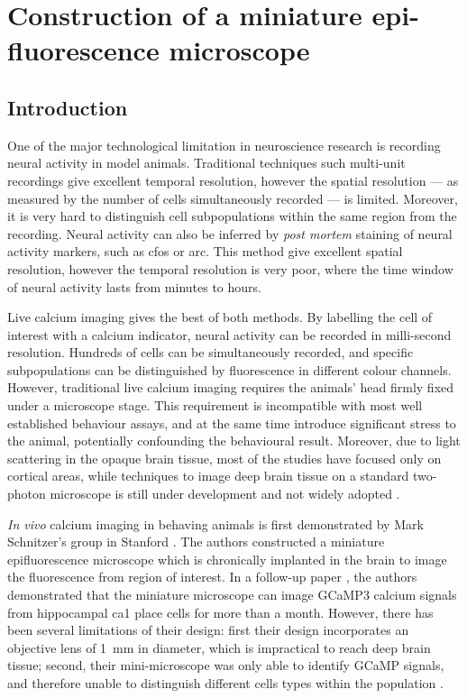 \chapter{Construction of a miniature epi-fluorescence microscope \label{chap-scope}}

\section{Introduction}

One of the major technological limitation in neuroscience research is recording neural activity in model animals. Traditional techniques such multi-unit recordings give excellent temporal resolution, however the spatial resolution --- as measured by the number of cells simultaneously recorded --- is limited. Moreover, it is very hard to distinguish cell subpopulations within the same region from the recording. Neural activity can also be inferred by \textit{post mortem} staining of neural activity markers, such as cfos or arc. This method give excellent spatial resolution, however the temporal resolution is very poor, where the time window of neural activity lasts from minutes to hours.

    Live calcium imaging gives the best of both methods. By labelling the cell of interest with a calcium indicator, neural activity can be recorded in milli-second resolution. Hundreds of cells can be simultaneously recorded, and specific subpopulations can be distinguished by fluorescence in different colour channels. However, traditional live calcium imaging requires the animals' head firmly fixed under a microscope stage. This requirement is incompatible with most well established behaviour assays, and at the same time introduce significant stress to the animal, potentially confounding the behavioural result. Moreover, due to light scattering in the opaque brain tissue, most of the studies have focused only on cortical areas, while techniques to image deep brain tissue on a standard two-photon microscope is still under development and not widely adopted \citep{barretto12}.

    \textit{In vivo} calcium imaging in behaving animals is first demonstrated by Mark Schnitzer's group in Stanford \citep{ghosh11}. The authors constructed a miniature epifluorescence microscope which is chronically implanted in the brain to image the fluorescence from region of interest. In a follow-up paper \citep{ziv13}, the authors demonstrated that the miniature microscope can image GCaMP3 calcium signals from hippocampal \gls{ca1} place cells for more than a month. However, there has been several limitations of their design: first their design incorporates an objective lens of \SI{1}{\mm}  in diameter, which is impractical to reach deep brain tissue; second, their mini-microscope was only able to identify GCaMP signals, and therefore unable to distinguish different cells types within the population \citep{ghosh11,ziv13}. 

